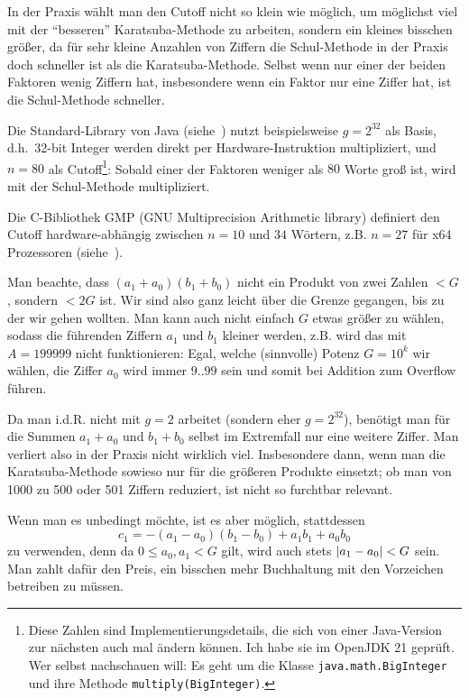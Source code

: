 \begin{remark}
    In der Praxis wählt man den Cutoff nicht so klein wie möglich, um möglichst viel mit der \enquote{besseren} Karatsuba-Methode zu arbeiten, sondern ein kleines bisschen größer, da für sehr kleine Anzahlen von Ziffern die Schul-Methode in der Praxis doch schneller ist als die Karatsuba-Methode. Selbst wenn nur einer der beiden Faktoren wenig Ziffern hat, insbesondere wenn ein Faktor nur eine Ziffer hat, ist die Schul-Methode schneller.

    \smallskip
    Die Standard-Library von Java (siehe~\cite{openjdk21}) nutzt beispielsweise $g=2^{32}$ als Basis, d.h.\ 32-bit Integer werden direkt per Hardware-Instruktion multipliziert, und $n=80$ als Cutoff\footnote{Diese Zahlen sind Implementierungsdetails, die sich von einer Java-Version zur nächsten auch mal ändern können. Ich habe sie im OpenJDK 21 geprüft. Wer selbst nachschauen will: Es geht um die Klasse \texttt{java.math.BigInteger} und ihre Methode \texttt{multiply(BigInteger)}.}: Sobald einer der Faktoren weniger als $80$ Worte groß ist, wird mit der Schul-Methode multipliziert.

    Die C-Bibliothek GMP (GNU Multiprecision Arithmetic library) definiert den Cutoff hardware-abhängig zwischen $n=10$ und $34$ Wörtern, z.B. $n=27$ für x64 Prozessoren (siehe~\cite{gmp6}).
\end{remark}

\begin{remark}
    Man beachte, dass $(a_1+a_0)(b_1+b_0)$ nicht ein Produkt von zwei Zahlen $<G$, sondern $<2G$ ist. Wir sind also ganz leicht über die Grenze gegangen, bis zu der wir gehen wollten. Man kann auch nicht einfach $G$ etwas größer zu wählen, sodass die führenden Ziffern $a_1$ und $b_1$ kleiner werden, z.B. wird das mit $A=199999$ nicht funktionieren: Egal, welche (sinnvolle) Potenz $G=10^k$ wir wählen, die Ziffer $a_0$ wird immer $9..99$ sein und somit bei Addition zum Overflow führen.

    \smallskip
    Da man i.d.R. nicht mit $g=2$ arbeitet (sondern eher $g=2^{32}$), benötigt man für die Summen $a_1+a_0$ und $b_1+b_0$ selbst im Extremfall nur eine weitere Ziffer. Man verliert also in der Praxis nicht wirklich viel. Insbesondere dann, wenn man die Karatsuba-Methode sowieso nur für die größeren Produkte einsetzt; ob man von 1000 zu 500 oder 501 Ziffern reduziert, ist nicht so furchtbar relevant.

    \medskip
    Wenn man es unbedingt möchte, ist es aber möglich, stattdessen
    \[c_1=-(a_1-a_0)(b_1-b_0)+a_1 b_1+a_0 b_0\]
    zu verwenden, denn da $0\leq a_0,a_1<G$ gilt, wird auch stets $\lvert a_1-a_0\rvert<G$ sein. Man zahlt dafür den Preis, ein bisschen mehr Buchhaltung mit den Vorzeichen betreiben zu müssen.
\end{remark}

